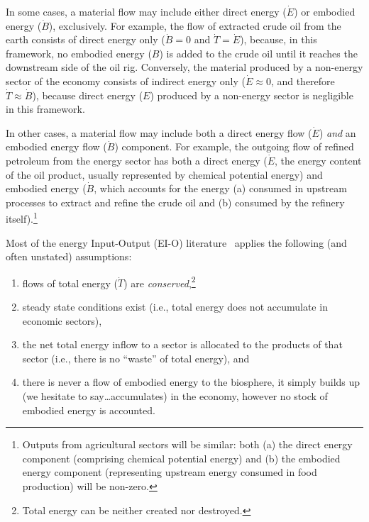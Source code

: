 In some cases, a material flow may include 
either direct energy ($\dot{E}$) 
or embodied energy ($\dot{B}$), exclusively. 
For example, the flow of extracted crude oil from the earth 
consists of direct energy only ($\dot{B} = 0$ and $\dot{T} = \dot{E}$), 
because, in this framework, no embodied energy ($B$) is added 
to the crude oil until it reaches the downstream side of the oil rig.
Conversely, the material produced by a non-energy sector of the economy 
consists of indirect energy only ($\dot{E} \approx 0$, 
and therefore $\dot{T} \approx \dot{B}$), 
because direct energy ($E$) produced by 
a non-energy sector is negligible in this framework. 

In other cases, a material flow may include both a direct energy flow
($\dot{E}$) \emph{and} an embodied energy flow ($\dot{B}$) component.
For example, the outgoing flow of refined petroleum from the energy sector 
has both a direct energy ($\dot{E}$, the energy content of the oil product, 
usually represented by chemical potential energy) 
and embodied energy ($\dot{B}$, which accounts for the energy 
(a) consumed in upstream processes 
to extract and refine the crude oil and 
(b) consumed by the refinery itself).\footnote{Outputs from 
agricultural sectors will be similar: 
both (a) the direct energy component (comprising chemical potential energy) 
and (b) the embodied energy component (representing upstream
energy consumed in food production) will be non-zero.}

Most of the energy Input-Output (EI-O) literature~\cite{Bullard1975, Herendeen1978} 
applies the following (and often unstated) assumptions:

\begin{enumerate}
	\item flows of total energy ($\dot{T}$) are 
	\emph{conserved},\footnote{Total energy 
	can be neither created nor destroyed.}

	\item steady state conditions exist 
	(i.e., total energy does not accumulate in economic 
	sectors),
	
	\item the net total energy inflow to a sector
	is allocated to the products of that sector (i.e., 
	there is no ``waste'' of total energy), and
	
	\item there is never a flow of embodied energy to the biosphere,
	it simply builds up (we hesitate to say\ldots{}accumulates) 
	in the economy, however no stock of embodied 
	energy is accounted.%
\end{enumerate}

